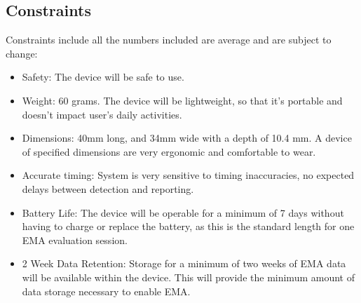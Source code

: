 \documentclass[12pt]{article}
\begin{document}
\subsection{Constraints}
Constraints include all the numbers included are average and are subject to change:
\begin{itemize}
    \item Safety: The device will be safe to use.
    \item Weight: 60 grams. The device will be lightweight, so that it's portable and doesn't impact user's daily activities.
    \item Dimensions: 40mm long, and 34mm wide with a depth of 10.4 mm. A device of specified dimensions are very ergonomic and comfortable to wear.
    \item Accurate timing: System is very sensitive to timing inaccuracies, no \linebreak expected delays between detection and reporting.
    \item Battery Life: The device will be operable for a minimum of 7 days without having to charge or replace the battery, as this is the standard length for one EMA evaluation session.
    \item 2 Week Data Retention: Storage for a minimum of two weeks of EMA data will be available within the device. This will provide the minimum amount of data storage necessary to enable EMA.
\end{itemize}

\pagebreak
\end{document}
